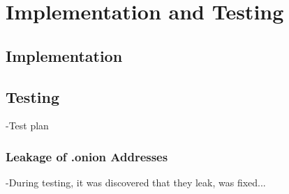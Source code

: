 \section{Implementation and Testing}
	\subsection{Implementation}
	\subsection{Testing}
		-Test plan
		\subsubsection*{Leakage of .onion Addresses}
			-During testing, it was discovered that they leak, was fixed...